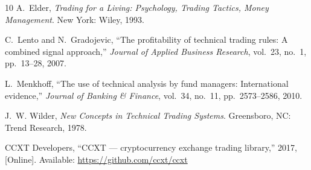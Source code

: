 \documentclass[conference]{IEEEtran}
\begin{document}
\begin{thebibliography}{10}
A.~Elder,
\emph{Trading for a Living: Psychology, Trading Tactics,
Money Management}.
New York: Wiley, 1993.

C.~Lento and N.~Gradojevic,
``The profitability of technical trading rules: A combined
signal approach,''
\emph{Journal of Applied Business Research},
vol.~23, no.~1, pp.~13--28, 2007.

L.~Menkhoff,
``The use of technical analysis by fund managers:
International evidence,''
\emph{Journal of Banking \& Finance}, vol.~34, no.~11,
pp.~2573--2586, 2010.

J.~W. Wilder,
\emph{New Concepts in Technical Trading Systems}.
Greensboro, NC: Trend Research, 1978.

CCXT Developers,
``CCXT --- cryptocurrency exchange trading library,''
2017, [Online]. Available: \url{https://github.com/ccxt/ccxt}

\end{thebibliography}
\end{document}
